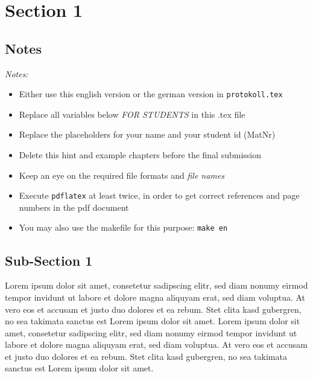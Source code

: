 \documentclass[12pt,a4paper,titlepage,oneside]{scrartcl}
\begin{document}
\maketitle
\setcounter{section}{0}
\setcounter{tocdepth}{2}
\tableofcontents

%
%

\section{Section 1}

\subsection{Notes}
\emph{Notes:}
\begin{itemize}
    \item Either use this english version or the german version in \lstinline{protokoll.tex}
    \item Replace all variables below \emph{FOR STUDENTS} in this .tex file
    \item Replace the placeholders for your name and your student id (MatNr)
    \item Delete this hint and example chapters before the final submission
    \item Keep an eye on the required file formats and \emph{file names}
    \item Execute \lstinline{pdflatex} at least twice, in order to get correct references and page numbers in the pdf document
    \item You may also use the makefile for this purpose: \lstinline{make en}
\end{itemize}

\subsection{Sub-Section 1}
Lorem ipsum dolor sit amet, consetetur sadipscing elitr, sed diam nonumy eirmod tempor invidunt ut labore et dolore magna aliquyam erat, sed diam voluptua. At vero eos et accusam et justo duo dolores et ea rebum. Stet clita kasd gubergren, no sea takimata sanctus est Lorem ipsum dolor sit amet. Lorem ipsum dolor sit amet, consetetur sadipscing elitr, sed diam nonumy eirmod tempor invidunt ut labore et dolore magna aliquyam erat, sed diam voluptua. At vero eos et accusam et justo duo dolores et ea rebum. Stet clita kasd gubergren, no sea takimata sanctus est Lorem ipsum dolor sit amet.
\end{document}
